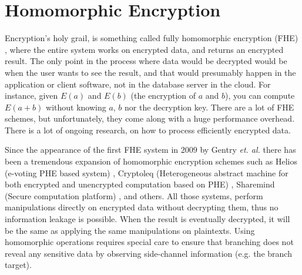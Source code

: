 \section{Homomorphic Encryption}\label{s:homomorphic-encryption}
Encryption's holy grail, is something called fully homomorphic encryption (FHE) \cite{gentry2009fully}, where the entire system works on encrypted data, and returns an encrypted result.
The only point in the process where data would be decrypted would be when the user wants to see the result, and that would presumably happen in the application or client software, not in the database server in the cloud.
For instance, given $E(a)$ and $E(b)$ (the encryption of $a$ and $b$), you can compute $E(a+b)$ without knowing $a$, $b$ nor the decryption key.
There are a lot of FHE schemes, but unfortunately, they come along with a huge performance overhead.
There is a lot of ongoing research, on how to process efficiently encrypted data.

Since the appearance of the first FHE system in 2009 by Gentry \textit{et. al.} there has been a tremendous expansion of homomorphic encryption schemes such as Helios (e-voting PHE based system) \cite{adida2008helios}, Cryptoleq (Heterogeneous abstract machine for both encrypted and unencrypted computation based on PHE) \cite{mazonka2016cryptoleq}, Sharemind (Secure computation platform) \cite{bogdanov2008sharemind, bogdanov2013sharemind}, and others.
All those systems, perform manipulations directly on encrypted data without decrypting them, thus no information leakage is possible.
When the result is eventually decrypted, it will be the same as applying the same manipulations on plaintexts.
Using homomorphic operations requires special care to ensure that branching does not reveal any sensitive data by observing side-channel information (e.g. the branch target).
